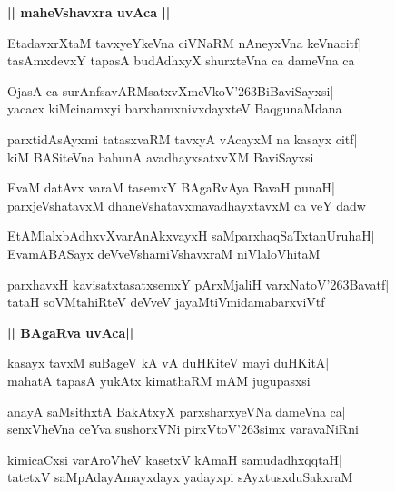 \documentclass[twoside,12pt,openright]{book}
\def\S{\char'263}
\newcounter{shloka}[chapter]
\def\uvaca#1{\centerline{{\large\textbf{#1}}}}
\begin{document}
\uvaca{|| maheVshavxra uvAca ||}
\begin{shloka}%
EtadavxrXtaM tavxyeYkeVna ciVNaRM nAneyxVna keVnacitf|\\
tasAmxdevxY tapasA budAdhxyX shurxteVna ca dameVna ca
\end{shloka}

\begin{shloka}%
OjasA ca surAnfsavARMsatxvXmeVkoV\S BiBaviSayxsi|\\
yacacx kiMcinamxyi barxhamxnivxdayxteV BaqgunaMdana
\end{shloka}

\begin{shloka}%
parxtidAsAyxmi tatasxvaRM tavxyA vAcayxM na kasayx citf|\\
kiM BASiteVna bahunA avadhayxsatxvXM BaviSayxsi
\end{shloka}

\begin{shloka}%
EvaM datAvx varaM tasemxY BAgaRvAya BavaH punaH|\\
parxjeVshatavxM dhaneVshatavxmavadhayxtavxM ca veY dadw
\end{shloka}

\begin{shloka}%
EtAMlalxbAdhxvXvarAnAkxvayxH saMparxhaqSaTxtanUruhaH|\\
EvamABASayx deVveVshamiVshavxraM niVlaloVhitaM 
\end{shloka}

\begin{shloka}%
parxhavxH kavisatxtasatxsemxY pArxMjaliH varxNatoV\S Bavatf|\\
tataH soVMtahiRteV deVveV jayaMtiVmidamabarxviVtf
\end{shloka}

\uvaca{|| BAgaRva uvAca||}
\begin{shloka}%
kasayx tavxM suBageV kA vA duHKiteV mayi duHKitA|\\
mahatA tapasA yukAtx kimathaRM mAM jugupasxsi
\end{shloka}

\begin{shloka}%
anayA saMsithxtA BakAtxyX parxsharxyeVNa dameVna ca|\\
senxVheVna ceYva sushorxVNi pirxVtoV\S simx varavaNiRni
\end{shloka}

\begin{shloka}%
kimicaCxsi varAroVheV kasetxV kAmaH samudadhxqqtaH|\\
tatetxV saMpAdayAmayxdayx yadayxpi sAyxtusxduSakxraM 
\end{shloka}
\end{document}
